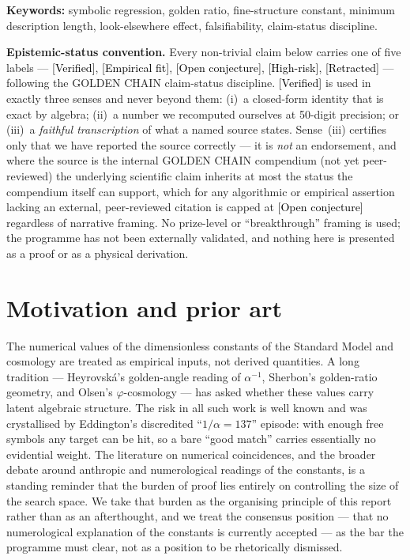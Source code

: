 \documentclass[11pt]{article}
\newcommand{\Verified}{\textcolor{black}{[Verified]}}
\newcommand{\Efit}{\textcolor{black}{[Empirical fit]}}
\newcommand{\Conj}{\textcolor{black}{[Open conjecture]}}
\newcommand{\Risk}{\textcolor{black}{[High-risk]}}
\newcommand{\Retr}{\textcolor{black}{[Retracted]}}
\newcommand{\phigr}{\varphi}
\begin{document}
\noindent\textbf{Keywords:} symbolic regression, golden ratio, fine-structure constant, minimum description length, look-elsewhere effect, falsifiability, claim-status discipline.

\medskip
\noindent\textbf{Epistemic-status convention.} Every non-trivial claim below carries one of five labels --- \Verified, \Efit, \Conj, \Risk, \Retr{} --- following the GOLDEN CHAIN claim-status discipline. \Verified{} is used in exactly three senses and never beyond them: (i)~a closed-form identity that is exact by algebra; (ii)~a number we recomputed ourselves at 50-digit precision; or (iii)~a \emph{faithful transcription} of what a named source states. Sense~(iii) certifies only that we have reported the source correctly --- it is \emph{not} an endorsement, and where the source is the internal GOLDEN CHAIN compendium (not yet peer-reviewed) the underlying scientific claim inherits at most the status the compendium itself can support, which for any algorithmic or empirical assertion lacking an external, peer-reviewed citation is capped at \Conj{} regardless of narrative framing. No prize-level or ``breakthrough'' framing is used; the programme has not been externally validated, and nothing here is presented as a proof or as a physical derivation.

\tableofcontents

\section{Motivation and prior art}\label{sec:motivation}
The numerical values of the dimensionless constants of the Standard Model and cosmology are treated as empirical inputs, not derived quantities. A long tradition --- Heyrovsk\'a's golden-angle reading of $\alpha^{-1}$, Sherbon's golden-ratio geometry, and Olsen's $\phigr$-cosmology --- has asked whether these values carry latent algebraic structure. The risk in all such work is well known and was crystallised by Eddington's discredited ``$1/\alpha = 137$'' episode: with enough free symbols any target can be hit, so a bare ``good match'' carries essentially no evidential weight. The literature on numerical coincidences, and the broader debate around anthropic and numerological readings of the constants, is a standing reminder that the burden of proof lies entirely on controlling the size of the search space. We take that burden as the organising principle of this report rather than as an afterthought, and we treat the consensus position --- that no numerological explanation of the constants is currently accepted --- as the bar the programme must clear, not as a position to be rhetorically dismissed.
\end{document}
